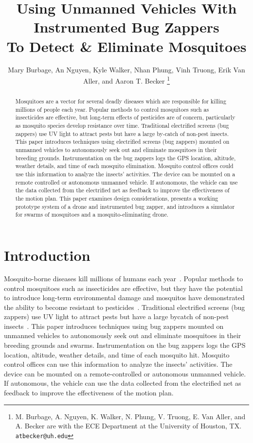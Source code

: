 \documentclass[letterpaper, 10 pt, conference]{ieeeconf}  %
\title{\LARGE \bf
Using Unmanned Vehicles With Instrumented Bug Zappers\\ To Detect \& Eliminate Mosquitoes
}
\author{Mary Burbage, An Nguyen, Kyle Walker, Nhan Phung, Vinh Truong, Erik Van Aller, and Aaron T. Becker%
\thanks{M. Burbage, A. Nguyen, K. Walker, N. Phung, V. Truong, E. Van Aller, and A. Becker are with the ECE Department at the University of Houston, TX.
        {\tt\small atbecker@uh.edu}}%
}
\begin{document}
\maketitle
\thispagestyle{empty}
\pagestyle{empty}


\begin{abstract}
Mosquitoes are a vector for several deadly diseases which are responsible for killing millions of people each year.  Popular methods to control mosquitoes such as insecticides are effective, but long-term effects of pesticides are of concern, particularly as mosquito species develop resistance over time.
Traditional electrified screens (bug zappers) use UV light to attract pests but have a large by-catch of non-pest insects. This paper introduces techniques using electrified screens (bug zappers) mounted on unmanned vehicles to autonomously seek out and eliminate mosquitoes in their breeding grounds. Instrumentation on the bug zappers logs the GPS location, altitude, weather details, and time of each mosquito elimination. Mosquito control offices could use this information to analyze the insects' activities. The device can be mounted on a remote controlled or autonomous unmanned vehicle. If autonomous, the vehicle can use the data collected from the electrified net as feedback to improve the effectiveness of the motion plan. 
This paper examines design considerations, presents a working prototype system of a drone and instrumented bug zapper, and introduces a simulator for swarms of mosquitoes and a mosquito-eliminating drone.  
\end{abstract}




\section{Introduction}

Mosquito-borne diseases kill millions of humans each year~\cite{murray2012global}. Popular methods to control mosquitoes such as insecticides are effective, but they have the potential to introduce long-term environmental damage and mosquitos have demonstrated the ability to become resistant to pesticides~\cite{ndiath2012resistance}. Traditional electrified screens (bug zappers) use UV light to attract pests but have a large bycatch of non-pest insects~\cite{University-Of-Florida1997}. This paper introduces techniques using bug zappers mounted on unmanned vehicles to autonomously seek out and eliminate mosquitoes in their breeding grounds and swarms. Instrumentation on the bug zappers logs the GPS location, altitude, weather details, and time of each mosquito hit.  Mosquito control offices can use this information to analyze the insects' activities. The device can be mounted on a remote-controlled or autonomous unmanned vehicle. If autonomous, the vehicle can use the data collected from the electrified net as feedback to improve the effectiveness of the motion plan. 
\end{document}
